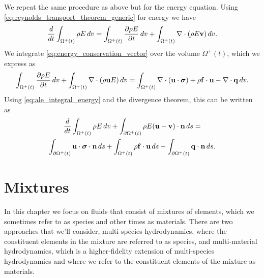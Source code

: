 \documentclass[oneside,a4paper,11pt]{report}
\begin{document}
We repeat the same procedure as above but for the energy equation. Using \cref{eq:reynolds_transport_theorem_generic} for energy we have
\begin{equation}
\label{eq:ale_integral_energy}
    \frac{d}{dt} \int_{\Omega^+(t)} \rho E \, dv = \int_{\Omega^+(t)} \frac{\partial \rho E}{\partial t} \, dv + \int_{\Omega^+(t)} \nabla \cdot (\rho E \mathbf{v}) \, dv.
\end{equation}
We integrate \cref{eq:energy_conservation_vector} over the volume $\Omega^+(t)$, which we express as
\begin{equation*}
    \int_{\Omega^+(t)} \frac{\partial \rho E}{\partial t} \, dv + \int_{\Omega^+(t)} \nabla \cdot (\rho \mathbf{u} E) \, dv = \int_{\Omega^+(t)} \nabla \cdot (\mathbf{u} \cdot \bm \sigma) + \rho \mathbf{f} \cdot \mathbf{u} - \nabla \cdot \mathbf{q} \, dv.
\end{equation*}
Using \cref{eq:ale_integral_energy} and the divergence theorem, this can be written as
\begin{multline}
    \label{eq:ale_integral_energy_conservation}
    \frac{d}{dt} \int_{\Omega^+(t)} \rho E \, dv + \int_{\partial \Omega^+(t)} \rho E (\mathbf{u} - \mathbf{v}) \cdot \mathbf{n} \, ds = \\
    \int_{\partial \Omega^+(t)} \mathbf{u} \cdot \bm \sigma \cdot \mathbf{n} \, ds + \int_{\Omega^+(t)} \rho \mathbf{f} \cdot \mathbf{u} \, ds - \int_{\partial \Omega^+(t)} \mathbf{q} \cdot \mathbf{n} \, ds.
\end{multline}

\chapter{Mixtures}
In this chapter we focus on fluids that consist of mixtures of elements, which we sometimes refer to as species and other times as materials. There are two approaches that we'll consider, multi-species hydrodynamics, where the constituent elements in the mixture are referred to as species, and multi-material hydrodynamics, which is a higher-fidelity extension of multi-species hydrodynamics and where we refer to the constituent elements of the mixture as materials. 

\end{document}
